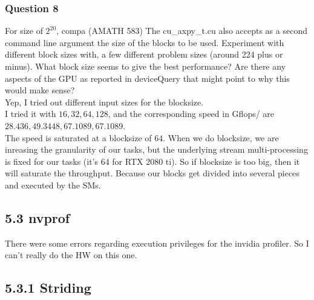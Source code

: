 \documentclass[]{article}
\begin{document}
        \subsubsection*{Question 8}
        For size of $2^{20}$, compa
            (AMATH 583) The cu\_axpy\_t.cu also accepts as a second command line argument the size of the blocks to be used. Experiment with different block sizes with, a few different problem sizes (around 224 plus or minus). What block size seems to give the best performance? Are there any aspects of the GPU as reported in deviceQuery that might point to why this would make sense?
            \\[1.1em]
            Yep, I tried out different input sizes for the blocksize. 
            \\
            I tried it with $16, 32, 64, 128$, and the corresponding speed in Gflops/ are $28.436, 49.3448, 67.1089, 67.1089$. 
            \\
            The speed is saturated at a blocksize of $64$. When we do blocksize, we are inreasing the granularity of our tasks, but the underlying stream multi-processing is fixed for our tasks (it's 64 for RTX 2080 ti). So if blocksize is too big, then it will saturate the throughput. Because our blocks get divided into several pieces and executed by the SMs. 
    \subsection*{5.3 nvprof}
        There were some errors regarding execution privileges for the invidia profiler. So I can't really do the HW on this one. 
    \subsection*{5.3.1 Striding}
\end{document}
